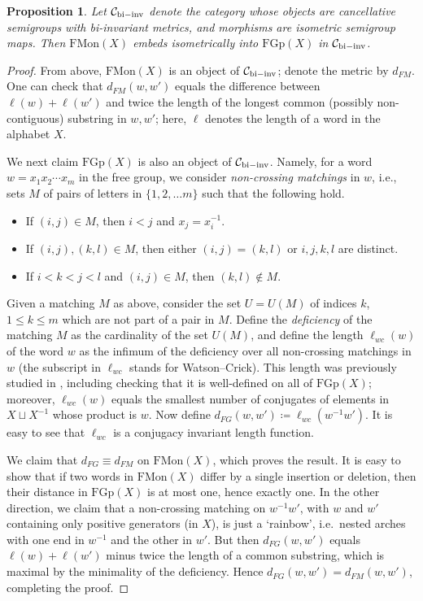 \documentclass[11pt,a4paper,reqno]{amsart}
\numberwithin{equation}{section}
\theoremstyle{plain}
\newtheorem{proposition}[equation]{Proposition}
\theoremstyle{definition}
\newcommand\normsymb{\ell}  %
\begin{document}
\begin{proposition}\label{Pisometry}
Let $\mathcal{C}_{\rm{bi-inv}}$ denote the category whose objects are
cancellative semigroups with bi-invariant metrics, and morphisms are
isometric semigroup maps. Then $\mathrm{FMon}(X)$ embeds isometrically
into $\mathrm{FGp}(X)$ in $\mathcal{C}_{\rm{bi-inv}}$.
\end{proposition}

\begin{proof}
From above, $\mathrm{FMon}(X)$ is an object of
$\mathcal{C}_{\rm{bi-inv}}$; denote the metric by $d_{FM}$. One can check
that $d_{FM}(w,w')$ equals the difference between $\normsymb(w) +
\normsymb(w')$ and twice the length of the longest common (possibly
non-contiguous) substring in $w,w'$; here, $\normsymb$ denotes the length
of a word in the alphabet $X$.

We next claim $\mathrm{FGp}(X)$ is also an object of
$\mathcal{C}_{\rm{bi-inv}}$. Namely, for a word $w=x_1x_2\cdots x_m$ in
the free group, we consider \emph{non-crossing matchings} in $w$, i.e.,
sets $M$ of pairs of letters in $\{1,2,\dots m\}$ such that the following
hold.
\begin{itemize}
\item If $(i, j)\in M$, then $i< j$ and  $x_j=x_i^{-1}$.
\item If $(i, j), (k, l) \in M$, then either $(i, j) = (k, l)$ or
$i,j,k,l$ are distinct.
\item If $i<k<j<l$ and $(i, j)\in M$, then $(k, l)\notin M$.
\end{itemize}

Given a matching $M$ as above, consider the set $U=U(M)$ of indices $k$,
$1\leq k\leq m$ which are not part of a pair in $M$. Define the
\emph{deficiency} of the matching $M$ as the cardinality of the set
$U(M)$, and define the length $\normsymb_{wc}(w)$ of the word $w$ as the
infimum of the deficiency over all non-crossing matchings in $w$ (the
subscript in $\normsymb_{wc}$ stands for Watson--Crick). This length was
previously studied in \cite{gadgil}, including checking that it is
well-defined on all of $\mathrm{FGp}(X)$; moreover, $\normsymb_{wc}(w)$
equals the smallest number of conjugates of elements in $X \sqcup X^{-1}$
whose product is $w$. Now define $d_{FG}(w,w') \coloneqq
\normsymb_{wc}(w^{-1} w')$. It is easy to see that $\normsymb_{wc}$ is a
conjugacy invariant length function.

We claim that $d_{FG} \equiv d_{FM}$ on $\mathrm{FMon}(X)$, which proves
the result. It is easy to show that if two words in $\mathrm{FMon}(X)$
differ by a single insertion or deletion, then their distance in
$\mathrm{FGp}(X)$ is at most one, hence exactly one. In the other
direction, we claim that a non-crossing matching on $w^{-1}w'$, with $w$
and $w'$ containing only positive generators (in $X$), is just a
`rainbow', i.e.~nested arches with one end in $w^{-1}$ and the other in
$w'$. But then $d_{FG}(w,w')$ equals $\normsymb(w) + \normsymb(w')$ minus
twice the length of a common substring, which is maximal by the
minimality of the deficiency. Hence $d_{FG}(w,w') = d_{FM}(w,w')$,
completing the proof.
\end{proof}
\end{document}
